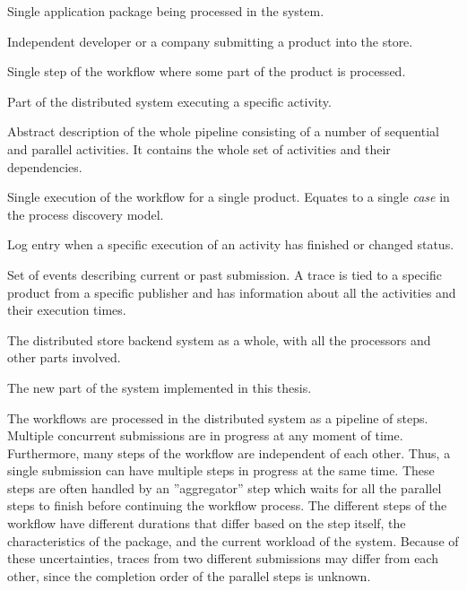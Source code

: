 \begin{description}[style=nextline]
\item[Product] 
Single application package being processed in the system. 

\item[Publisher] 
Independent developer or a company submitting a product into the store.

\item[Activity] 
Single step of the workflow where some part of the product is processed. 

\item[Processor] 
Part of the distributed system executing a specific activity.

\item[Workflow]
Abstract description of the whole pipeline consisting of a number of sequential and parallel activities. It contains the whole set of activities and their dependencies.

\item[Submission] 
Single execution of the workflow for a single product. Equates to a single \emph{case} in the process discovery model.

\item[Event] 
Log entry when a specific execution of an activity has finished or changed status. 

\item[Trace] 
Set of events describing current or past submission. 
A trace is tied to a specific product from a specific publisher and has information about all the activities and their execution times. 

\item[System] 
The distributed store backend system as a whole, with all the processors and other parts involved.

\item[Project] 
The new part of the system implemented in this thesis.

\label{desc:termdefinitions}
\end{description}


The workflows are processed in the distributed system as a pipeline of steps. 
Multiple concurrent submissions are in progress at any moment of time.
Furthermore, many steps of the workflow are independent of each other.
Thus, a single submission can have multiple steps in progress at the same time.
These steps are often handled by an ''aggregator'' step which waits for 
all the parallel steps to finish before continuing the workflow process.
The different steps of the workflow have different durations that differ based on
the step itself, the characteristics of the package, and the current workload of the system.
Because of these uncertainties, traces from two different submissions may differ from each other, 
since the completion order of the parallel steps is unknown.

